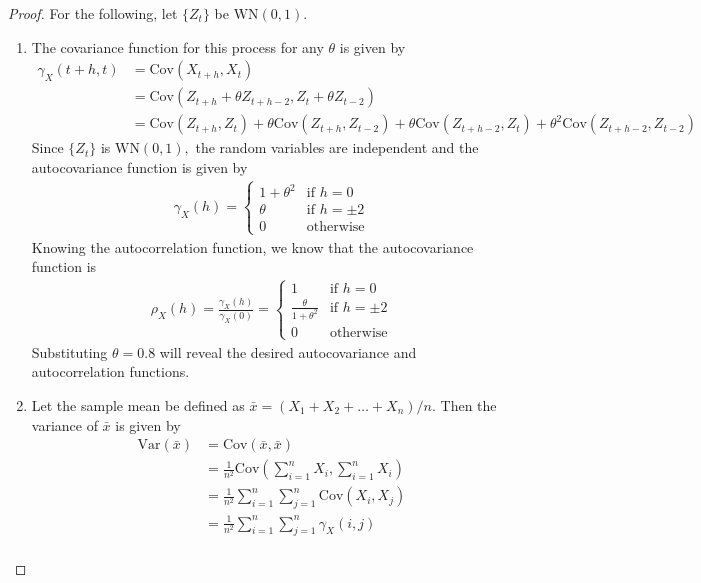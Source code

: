\documentclass[12pt]{article}
\theoremstyle{definition}
\newcommand{\V}{\text{Var}}
\newcommand{\Co}[2]{\text{Cov}({#1}, {#2})}
\newcommand{\gx}[2]{\gamma_X({#1}, {#2})}
\begin{document}
\begin{proof}
  For the following, let $\{ Z_t \}$ be $\text{WN}(0, 1).$
  \begin{enumerate}
    \item The covariance function for this process for any $\theta$ is given by
      \begin{align*}
        \gx{t+h}{t} &= \Co{X_{t+h}}{X_t} \\
        &= \Co{Z_{t+h} + \theta Z_{t + h - 2}}{Z_t + \theta Z_{t-2}} \\
        &= \Co{Z_{t+h}}{Z_t} + \theta \Co{Z_{t+h}}{Z_{t-2}} + \theta \Co{Z_{t+h-2}}{Z_t} + \theta^2 \Co{Z_{t+h-2}}{Z_{t-2}}
      \end{align*}
      Since $\{ Z_t \}$ is $\text{WN}(0, 1),$ the random variables are independent
      and the autocovariance function is given by
      \begin{align*}
        \gamma_X(h) =
        \begin{cases}
          1 + \theta^2 & \text{if $h=0$} \\
          \theta & \text{if $h =\pm2$} \\
          0 & \text{otherwise}
        \end{cases}
      \end{align*}
      Knowing the autocorrelation function, we know that the autocovariance function is
      \begin{align*}
        \rho_X(h) = \frac{\gamma_X(h)}{\gamma_X(0)} =
        \begin{cases}
          1 & \text{if $h=0$} \\
          \frac{\theta}{1 + \theta^2} & \text{if $h =\pm2$} \\
          0 & \text{otherwise}
        \end{cases}
      \end{align*}
      Substituting $\theta = 0.8$ will reveal the desired autocovariance and
      autocorrelation functions.
    \item Let the sample mean be defined as $\bar{x} = (X_1 + X_2 + \dots + X_n) / n$.
      Then the variance of $\bar{x}$ is given by
      \begin{align*}
        \V(\bar{x}) &= \Co{\bar{x}}{\bar{x}} \\
        &= \frac{1}{n^2}\text{Cov}\left(\sum_{i=1}^n X_i, \sum_{i=1}^n X_i\right) \\
        &= \frac{1}{n^2}\sum_{i=1}^n\sum_{j=1}^n\Co{X_i}{X_j} \\
        &= \frac{1}{n^2}\sum_{i=1}^n\sum_{j=1}^n \gx{i}{j} \\

\end{align*}
\end{enumerate}
\end{proof}
\end{document}
